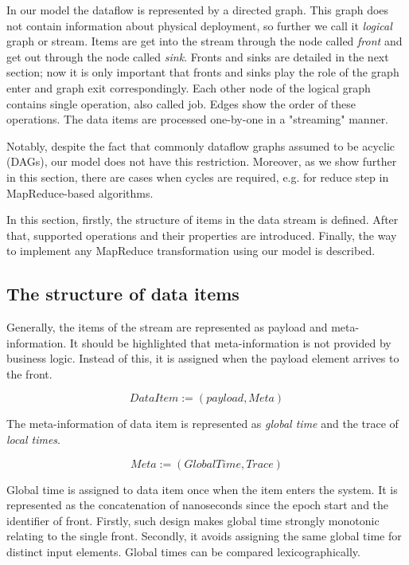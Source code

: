 
\label {fs-model-section}
In our model the dataflow is represented by a directed graph. This graph does not contain information about physical deployment, so further we call it {\it logical} graph or stream. Items are get into the stream through the node called {\it front} and get out through the node called {\it sink}. Fronts and sinks are detailed in the next section; now it is only important that fronts and sinks play the role of the graph enter and graph exit correspondingly. Each other node of the logical graph contains single operation, also called job. Edges show the order of these operations. The data items are processed one-by-one in a "streaming" manner. 

Notably, despite the fact that commonly dataflow graphs assumed to be acyclic (DAGs), our model does not have this restriction. Moreover, as we show further in this section, there are cases when cycles are required, e.g. for reduce step in MapReduce-based algorithms. 

In this section, firstly, the structure of items in the data stream is defined. After that, supported operations and their properties are introduced. Finally, the way to implement any MapReduce transformation using our model is described.

\subsection{The structure of data items}
Generally, the items of the stream are represented as payload and meta-information. It should be highlighted that meta-information is not provided by business logic. Instead of this, it is assigned when the payload element arrives to the front. 

\[DataItem := (payload, Meta)\]

The meta-information of data item is represented as {\it global time} and the trace of {\it local times}.

\[Meta := (GlobalTime, Trace)\]

Global time is assigned to data item once when the item enters the system. It is represented as the concatenation of nanoseconds since the epoch start and the identifier of front. Firstly, such design makes global time strongly monotonic relating to the single front. Secondly, it avoids assigning the same global time for distinct input elements. Global times can be compared lexicographically.

